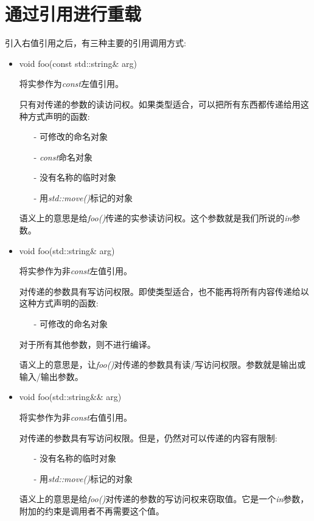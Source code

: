 \section{通过引用进行重载}
引入右值引用之后，有三种主要的引用调用方式:

\begin{itemize}
	\item \begin{cppcode}
void foo(const std::string\& arg)
\end{cppcode}
	将实参作为\textit{const}左值引用。

	只有对传递的参数的读访问权。如果类型适合，可以把所有东西都传递给用这种方式声明的函数:

	\begin{itemize}
		\item[-] 可修改的命名对象
		\item[-] \textit{const}命名对象
		\item[-] 没有名称的临时对象
		\item[-] 用\textit{std::move()}标记的对象
	\end{itemize}
	语义上的意思是给\textit{foo()}传递的实参读访问权。这个参数就是我们所说的\textit{in}参数。
	\item \begin{cppcode}
void foo(std::string\& arg)
\end{cppcode}
	将实参作为非\textit{const}左值引用。

	对传递的参数具有写访问权限。即使类型适合，也不能再将所有内容传递给以这种方式声明的函数:

	\begin{itemize}
		\item[-] 可修改的命名对象
	\end{itemize}
	对于所有其他参数，则不进行编译。

	语义上的意思是，让\textit{foo()}对传递的参数具有读/写访问权限。参数就是输出或输入/输出参数。

	\item \begin{cppcode}
void foo(std::string\&\& arg)
\end{cppcode}
	将实参作为非\textit{const}右值引用。

	对传递的参数具有写访问权限。但是，仍然对可以传递的内容有限制:

	\begin{itemize}
		\item[-] 没有名称的临时对象
		\item[-] 用\textit{std::move()}标记的对象
	\end{itemize}
	语义上的意思是给\textit{foo()}对传递的参数的写访问权来窃取值。它是一个\textit{in}参数，附加的约束是调用者不再需要这个值。
\end{itemize}


